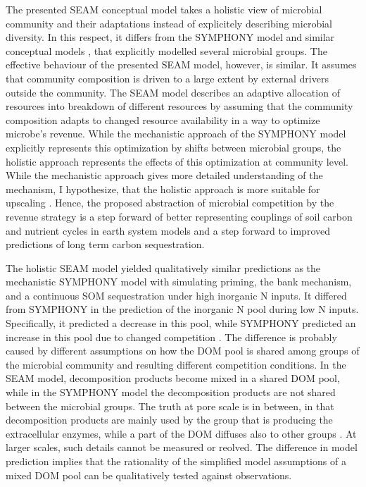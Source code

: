 The presented SEAM conceptual model takes a holistic view \citep{Panikov10} of
microbial community and their adaptations instead of explicitely describing
microbial diversity.
In this respect, it differs from the SYMPHONY model \citep{Perveen14} and
similar conceptual models \citep{Fontaine03}, that explicitly modelled several
microbial groups.
The effective behaviour of the presented SEAM model, however, is similar.
It assumes that community composition is driven to a large extent by external
drivers outside the community. The SEAM model describes an adaptive allocation
of resources into breakdown of different resources by assuming that the
community composition adapts to changed resource availability in a way to
optimize microbe's revenue.
While the mechanistic approach of the SYMPHONY model explicitly represents this
optimization by shifts between microbial groups, the holistic approach
represents the effects of this optimization at community level.
While the mechanistic approach gives more detailed understanding of the mechanism,
I hypothesize, that the holistic approach is more suitable for upscaling
\citep{Wutzler13}.
Hence, the proposed abstraction of microbial competition by the revenue strategy
is a step forward of better representing couplings of soil carbon and nutrient
cycles in earth system models and a step forward to improved predictions of long
term carbon sequestration.

The holistic SEAM model yielded qualitatively similar predictions as the
mechanistic SYMPHONY model with simulating priming, the bank mechanism, and a
continuous SOM sequestration under high inorganic N inputs. It differed from
SYMPHONY in the prediction of the inorganic N pool during low N inputs.
Specifically, it predicted a decrease in this pool, while SYMPHONY predicted an
increase in this pool due to changed competition \citep{Perveen14}. The
difference is probably caused by different assumptions on how the DOM pool is
shared among groups of the microbial community and resulting different
competition conditions. In the SEAM model, decomposition products become mixed
in a shared DOM pool, while in the SYMPHONY model the decomposition products are
not shared between the microbial groups.
The truth at pore scale is in between, in that decomposition products are mainly
used by the group that is producing the extracellular enzymes, while a part of
the DOM diffuses also to other groups \citep{Kaiser14}. At larger scales, such
details cannot be measured or reolved. The difference in model prediction
implies that the rationality of the simplified model assumptions of a mixed
DOM pool can be qualitatively tested against observations. 

